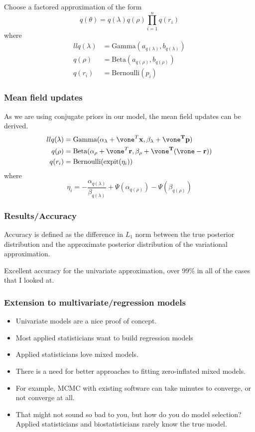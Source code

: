 \documentclass{beamer}
\begin{document}
\begin{frame}
Choose a factored approximation of the form
$$
q(\theta) = q(\lambda) q(\rho) \prod_{i=1}^n q(r_i)
$$
where
\begin{align*}{ll}
q(\lambda) &= \text{Gamma}(a_{q(\lambda)}, b_{q(\lambda)}) \\
q(\rho) &= \text{Beta}(a_{q(\rho)}, b_{q(\rho)}) \\
q(r_i) &= \text{Bernoulli}(p_i)
\end{align*}

\end{frame}


\begin{frame}
\frametitle{Mean field updates}
As we are using conjugate priors in our model, the mean field updates can be derived.
\begin{align*}{ll}
q(\lambda) &= \text{Gamma}(\alpha_\lambda + \vone^T \vx, \beta_\lambda + \vone^T\vp) \\
q(\rho) &= \text{Beta}(\alpha_\rho + \vone^T\vr, \beta_\rho + \vone^T(\vone - \vr)) \\
q(r_i) &= \text{Bernoulli}(\text{expit}(\eta_i))
\end{align*}
where
$$
\eta_i = - \frac{\alpha_{q(\lambda)}}{\beta_{q(\lambda)}} + \Psi(\alpha_{q(\rho)}) - \Psi(\beta_{q(\rho)})
$$
\end{frame}

\begin{frame}
\frametitle{Results/Accuracy}
Accuracy is defined as the difference in $L_1$ norm between the true posterior distribution and
the approximate posterior distribution of the variational approximation.

Excellent accuracy for the univariate approximation, over 99\% in all of the cases that I looked at.
\end{frame}

\begin{frame}
\frametitle{Extension to multivariate/regression models}
\begin{itemize}
\item Univariate models are a nice proof of concept.
\item Most applied statisticians want to build regression models
\item Applied statisticians love mixed models.
\item There is a need for better approaches to fitting zero-inflated mixed models.
\item For example, MCMC with existing software can take minutes to
converge, or not converge at all.
\item That might not sound so bad to you, but how do you
do model selection? Applied statisticians and biostatisticians rarely know the true model.
\end{itemize}
\end{frame}
\end{document}
